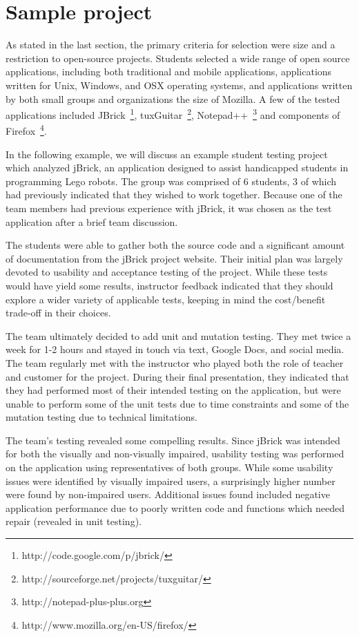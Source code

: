 \documentclass{sig-alternate}
\begin{document}
\section{Sample project}
\label{sec: sampleproject}


As stated in the last section, the primary criteria for selection were size and a restriction to open-source projects. Students selected a wide range of open source applications, including both traditional and mobile applications, applications written for Unix, Windows, and OSX operating systems, and applications written by both small groups and organizations the size of Mozilla. A few of the tested applications included JBrick~\footnote{http://code.google.com/p/jbrick/}, tuxGuitar~\footnote{http://sourceforge.net/projects/tuxguitar/},  Notepad++~\footnote{http://notepad-plus-plus.org} and components of Firefox~\footnote{http://www.mozilla.org/en-US/firefox/}.

In the following example, we will discuss an example student testing project which analyzed jBrick, an application designed to assist handicapped students in programming Lego robots. The group was comprised of 6 students, 3 of which had previously indicated that they wished to work together. Because one of the team members had previous experience with jBrick, it was chosen as the test application after a brief team discussion.

The students were able to gather both the source code and a significant amount of documentation from the jBrick project website. Their initial plan was largely devoted to usability and acceptance testing of the project. While these tests would have yield some results, instructor feedback indicated that they should explore a wider variety of applicable tests, keeping in mind the cost/benefit trade-off in their choices.

The team ultimately decided to add unit and mutation testing. They met twice a week for 1-2 hours and stayed in touch via text, Google Docs, and social media. The team regularly met with the instructor who played both the role of teacher and customer for the project. During their final presentation, they indicated that they had performed most of their intended testing on the application, but were unable to perform some of the unit tests due to time constraints and some of the mutation testing due to technical limitations.

The team's testing revealed some compelling results. Since jBrick was intended for both the visually and non-visually impaired, usability testing was performed on the application using representatives of both groups. While some usability issues were identified by visually impaired users, a surprisingly higher number were found by non-impaired users. Additional issues found included negative application performance due to poorly written code and functions which needed repair (revealed in unit testing).
\end{document}
